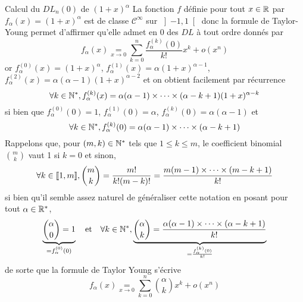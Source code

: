 \documentclass{article}
\renewenvironment{question_kholle}[2][ ]
{
	\subsection{\texorpdfstring{#2}{}}
	\notblank{#1}
	{
		\noindent #1
		\bigbreak
	}
	{}
	\begin{proof}
}
{
	\end{proof}
}
\begin{document}
\begin{question_kholle}{Calcul du $DL_{n}(0)$ de $(1+x)^{\alpha}$}
	La fonction $f$ définie pour tout $x\in\mathbb R$ par $f_{\alpha}(x)=(1+x)^{\alpha}$ est de classe $\mathcal{C}^{\infty}$ sur $\left]-1, 1\right[$ donc la formule de Taylor-Young permet d’affirmer qu’elle admet en 0 des $DL$ à tout ordre donnés par
	\[
		f_{\alpha}(x) \underset{x\to 0}{=} \sum_{k=0}^{n}\frac{f_{\alpha}^{(k)}(0)}{k!}x^{k} + o(x^{n})
	\]
	or $f_{\alpha}^{(0)}(x)=(1+x)^{\alpha}$, $f_{\alpha}^{(1)}(x)=\alpha(1+x)^{\alpha-1}$, $f_{\alpha}^{(2)}(x)=\alpha(\alpha-1)(1+x)^{\alpha-2}$ et on obtient facilement par récurrence
	\[
		\forall k\in\mathbb N^{*}, f_{\alpha}^{(k)}(x)=\alpha(\alpha-1)\times\cdots\times (\alpha-k+1)(1+x)^{\alpha-k}
	\]
	si bien que $f_{\alpha}^{(0)}(0)=1$, $f_{\alpha}^{(1)}(0)=\alpha$, $f_{\alpha}^{(k)}(0)=\alpha(\alpha-1)$ et
	\[
		\forall k\in\mathbb N^{*}, f_{\alpha}^{(k)}(0) = \alpha(\alpha-1)\times\cdots\times (\alpha-k+1)
	\]
	Rappelons que, pour $(m,k)\in\mathbb N^{*}$ tels que $1\leq k\leq m$, le coefficient binomial $\binom{m}{k}$ vaut 1 si $k=0$ et sinon,
	\[
		\forall k\in[\![ 1,m ]\!], \binom{m}{k}=\frac{m!}{k!(m-k)!}=\frac{m(m-1)\times\cdots\times (m-k+1)}{k!}
	\]
	si bien qu’il semble assez naturel de généraliser cette notation en posant pour tout $\alpha\in\mathbb R^{*}$,
	\[
		\underbrace{\binom{\alpha}{0}=1}_{=f_{\alpha}^{(0)}(0)} \quad\text{et}\quad \forall k\in\mathbb N^{*}, \underbrace{\binom{\alpha}{k}=\frac{\alpha(\alpha-1)\times \cdots \times (\alpha-k+1)}{k!}}_{=\frac{f_{\alpha}^{(k)}(0)}{k!}}
	\]
	de sorte que la formule de Taylor Young s’écrive
	\[
		f_{\alpha}(x) \underset{x\to 0}{=}\sum_{k=0}^{n}\binom{\alpha}{k}x^{k}+o(x^{n})
	\]
\end{question_kholle}
\end{document}
